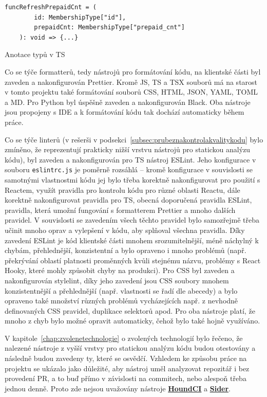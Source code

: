 \begin{listing}[ht]
	\begin{verbatim}
funcRefreshPrepaidCnt = (
        id: MembershipType["id"],
        prepaidCnt: MembershipType["prepaid_cnt"]
    ): void => {...}
	\end{verbatim}
	\caption{Anotace typů v TS}\label{lst:statictyping-js}
\end{listing}

Co se týče formatterů, tedy nástrojů pro formátování kódu, na klientské části byl zaveden a nakonfigurován Prettier. Kromě JS, TS a TSX souborů má na starost v tomto projektu také formátování souborů CSS, HTML, JSON, YAML, TOML a MD. Pro Python byl úspěšně zaveden a nakonfigurován Black. Oba nástroje jsou propojeny s IDE a k formátování kódu tak dochází automaticky během práce.

Co se týče linterů (v rešerši v podsekci~\ref{subsec:prubeznakontrolakvalitykodu} bylo zmíněno, že reprezentují prakticky nižší vrstvu nástrojů pro statickou analýzu kódu), byl zaveden a nakonfigurován pro TS nástroj ESLint. Jeho konfigurace v souboru \verb|eslintrc.js| je poměrně rozsáhlá -- kromě konfigurace v souvislosti se samotnými vlastnostmi kódu jej bylo třeba korektně nakonfigurovat pro použití s Reactem, využít pravidla pro kontrolu kódu pro různé oblasti Reactu, dále korektně nakonfigurovat pravidla pro TS, obecná doporučená pravidla ESLint, pravidla, která umožní fungování s formatterem Prettier a mnoho dalších pravidel. V souvislosti se zavedením všech těchto pravidel bylo samozřejmě třeba učinit mnoho oprav a vylepšení v kódu, aby splňoval všechna pravidla. Díky zavedení ESLint je kód klientské části mnohem srozumitelnější, méně náchylný k chybám, přehlednější, konzistentní a bylo opraveno i mnoho problémů (např. překrývání oblastí platnosti proměnných kvůli stejnému názvu, problémy s React Hooky, které mohly způsobit chyby na produkci). Pro CSS byl zaveden a nakonfigurován stylelint, díky jeho zavedení jsou CSS soubory mnohem konzistentnější a přehlednější (např. vlastnosti se řadí dle abecedy) a bylo opraveno také množství různých problémů vycházejících např. z nevhodně definovaných CSS pravidel, duplikace selektorů apod. Pro oba nástroje platí, že mnoho z chyb bylo možné opravit automaticky, čehož bylo také hojně využíváno.

V kapitole~\ref{chap:zvolenetechnologie} o zvolených technologií bylo řečeno, že nalezené nástroje z vyšší vrstvy pro statickou analýzu kódu budou otestovány a následně budou zavedeny ty, které se osvědčí. Vzhledem ke způsobu práce na projektu se ukázalo jako důležité, aby nástroj uměl analyzovat repozitář i bez provedení PR, a to buď přímo v závislosti na commitech, nebo alespoň třeba jednou denně. Proto zde nejsou uvažovány nástroje \href{https://houndci.com}{\textbf{HoundCI}} a \href{https://sider.review}{\textbf{Sider}}.

